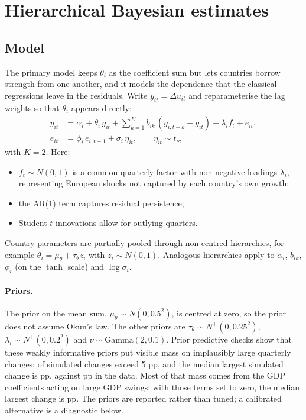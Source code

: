 \section{Hierarchical Bayesian estimates}\label{sec:bayes}

\subsection{Model}

The primary model keeps $\theta_i$ as the coefficient sum but lets countries borrow
strength from one another, and it models the dependence that the classical regressions
leave in the residuals. Write $y_{it}=\Delta u_{it}$ and reparameterise the lag weights so
that $\theta_i$ appears directly:
\begin{align}
  y_{it} &= \alpha_i + \theta_i\, g_{it} + \sum_{k=1}^{K} b_{ik}\,(g_{i,t-k}-g_{it})
            + \lambda_i f_t + e_{it}, \label{eq:bayes}\\
  e_{it} &= \phi_i\, e_{i,t-1} + \sigma_i\,\eta_{it},\qquad \eta_{it}\sim t_\nu ,
\end{align}
with $K=2$. Here:
\begin{itemize}
  \item $f_t\sim N(0,1)$ is a common quarterly factor with non-negative loadings
    $\lambda_i$, representing European shocks not captured by each country's own growth;
  \item the AR(1) term captures residual persistence;
  \item Student-$t$ innovations allow for outlying quarters.
\end{itemize}
Country parameters are partially pooled \citep{gelman2013bda} through non-centred
hierarchies, for example
$\theta_i=\mu_\theta+\tau_\theta z_i$ with $z_i\sim N(0,1)$. Analogous hierarchies apply
to $\alpha_i$, $b_{ik}$, $\phi_i$ (on the $\tanh$ scale) and $\log\sigma_i$.

\paragraph{Priors.} The prior on the mean sum, $\mu_\theta\sim N(0,0.5^2)$, is centred at
zero, so the prior does not assume Okun's law. The other priors are
$\tau_\theta\sim N^+(0,0.25^2)$, $\lambda_i\sim N^+(0,0.2^2)$ and
$\nu\sim\mathrm{Gamma}(2,0.1)$. Prior predictive checks show that these weakly informative
priors put visible mass on implausibly large quarterly changes:  of
simulated changes exceed 5 pp, and the median largest simulated change is
 pp, against  pp in the data. Most of that mass
comes from the GDP coefficients acting on large GDP swings: with those terms set to zero,
the median largest change is  pp. The priors are reported
rather than tuned; a calibrated alternative is a diagnostic below.

